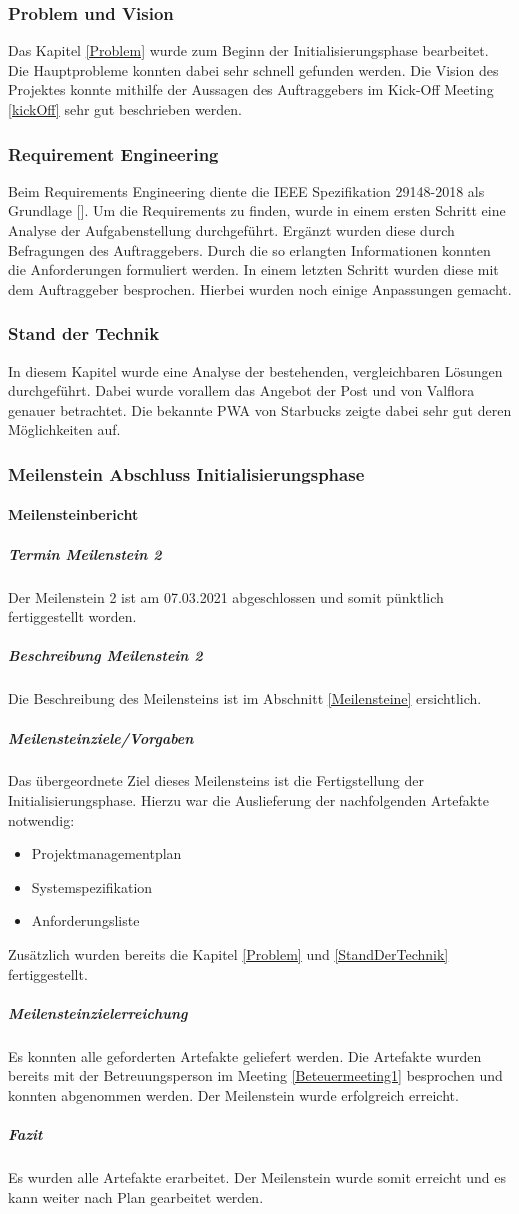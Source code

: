 \subsubsection{Problem und Vision}
Das Kapitel \ref{Problem} wurde zum Beginn der Initialisierungsphase bearbeitet. Die Hauptprobleme konnten dabei sehr schnell gefunden werden. Die Vision des Projektes konnte mithilfe der Aussagen des Auftraggebers im Kick-Off Meeting \ref{kickOff} sehr gut beschrieben werden. 
\subsubsection{Requirement Engineering}
Beim Requirements Engineering diente die IEEE Spezifikation 29148-2018 als Grundlage [\cite{ieeeSrs}]. Um die Requirements zu finden, wurde in einem ersten Schritt eine Analyse der Aufgabenstellung durchgeführt. Ergänzt wurden diese durch Befragungen des Auftraggebers. Durch die so erlangten Informationen konnten die Anforderungen formuliert werden. In einem letzten Schritt wurden diese mit dem Auftraggeber besprochen. Hierbei wurden noch einige Anpassungen gemacht. 
\subsubsection{Stand der Technik}
In diesem Kapitel wurde eine Analyse der bestehenden, vergleichbaren Lösungen durchgeführt. Dabei wurde vorallem das Angebot der Post und von Valflora genauer betrachtet. Die bekannte \ac{PWA} von Starbucks zeigte dabei sehr gut deren Möglichkeiten auf. 
\subsubsection{Meilenstein Abschluss Initialisierungsphase}

\paragraph{Meilensteinbericht}
\subparagraph{Termin Meilenstein 2}
Der Meilenstein 2 ist am 07.03.2021 abgeschlossen und somit pünktlich fertiggestellt worden.
\subparagraph{Beschreibung Meilenstein 2}
Die Beschreibung des Meilensteins ist im Abschnitt \ref{Meilensteine} ersichtlich. 
\subparagraph{Meilensteinziele/Vorgaben}
Das übergeordnete Ziel dieses Meilensteins ist die Fertigstellung der Initialisierungsphase.
Hierzu war die Auslieferung der nachfolgenden Artefakte notwendig:
\begin{itemize}
	\item Projektmanagementplan
	\item Systemspezifikation
	\item Anforderungsliste
\end{itemize}
Zusätzlich wurden bereits die Kapitel \ref{Problem} und \ref{StandDerTechnik} fertiggestellt. 
\subparagraph{Meilensteinzielerreichung}
Es konnten alle geforderten Artefakte geliefert werden. Die Artefakte wurden bereits mit der Betreuungsperson im Meeting \ref{Beteuermeeting1} besprochen und konnten abgenommen werden. 
Der Meilenstein wurde erfolgreich erreicht. 
\subparagraph{Fazit}
Es wurden alle Artefakte erarbeitet. Der Meilenstein wurde somit erreicht und es kann weiter nach Plan gearbeitet werden.
